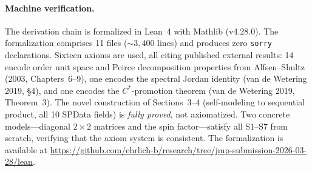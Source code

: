 \paragraph{Machine verification.}
The derivation chain is formalized in Lean~4 with Mathlib (v4.28.0).
The formalization comprises 11 files (${\sim}3{,}400$ lines) and
produces zero \texttt{sorry} declarations.  Sixteen axioms are used,
all citing published external results: 14 encode order unit space
and Peirce decomposition properties from Alfsen--Shultz (2003,
Chapters~6--9), one encodes the spectral Jordan identity (van de
Wetering 2019, \S4), and one encodes the $C^{*}$-promotion theorem
(van de Wetering 2019, Theorem~3).  The novel construction of
Sections~3--4 (self-modeling to sequential product, all 10 SPData
fields) is \emph{fully proved}, not axiomatized.
Two concrete models---diagonal $2 \times 2$ matrices and the spin
factor---satisfy all S1--S7 from scratch, verifying that the axiom
system is consistent.  The formalization is available at
\url{https://github.com/ehrlich-b/research/tree/jmp-submission-2026-03-28/lean}.
